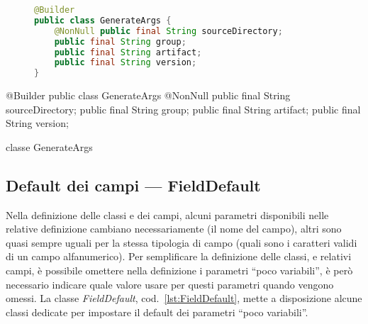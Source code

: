 \ifesource
\begin{figure*}[!htb]
\begin{lstlisting}[language=java, caption=classe GenerateArgs, 
label=lst:GenerateArgs]
@Builder
public class GenerateArgs {
    @NonNull public final String sourceDirectory;
    public final String group;
    public final String artifact;
    public final String version;
}
\end{lstlisting}
\end{figure*}
\else
\begin{elisting}[!htb]
\begin{javacode}
@Builder
public class GenerateArgs {
    @NonNull public final String sourceDirectory;
    public final String group;
    public final String artifact;
    public final String version;
}
\end{javacode}
\caption{classe GenerateArgs}
\label{lst:GenerateArgs}
\end{elisting}
\fi

\subsection{Default dei campi --- FieldDefault}
Nella definizione delle classi e dei campi, alcuni parametri disponibili nelle
relative definizione cambiano necessariamente (il nome del campo), altri sono
quasi sempre uguali per la stessa tipologia di campo (quali sono i caratteri
validi di un campo alfanumerico).
Per semplificare la definizione delle classi, e relativi campi, è possibile
omettere nella definizione i parametri ``poco variabili'', è però necessario
indicare quale valore usare per questi parametri quando vengono omessi.
La classe \textsl{FieldDefault}, cod.~\ref{lst:FieldDefault}, mette a 
disposizione alcune classi dedicate per impostare il default dei parametri 
``poco variabili''.

